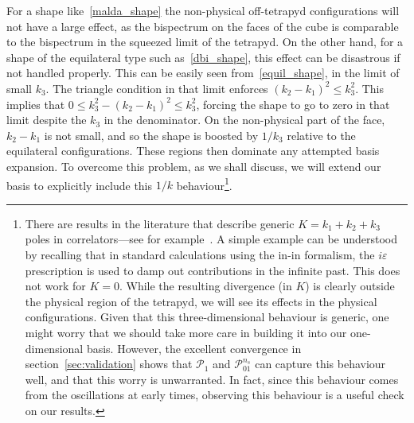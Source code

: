 \documentclass[a4paper,12pt]{extarticle}
\newcommand{\Linvk}{\mathcal{P}_1}
\newcommand{\Lnsboth}{\mathcal{P}^{n_s}_{01}}
\begin{document}
For a shape like~\eqref{malda_shape} the non-physical off-tetrapyd configurations
will not have a large effect, as the bispectrum on the faces of the cube is comparable
to the bispectrum in the squeezed limit of the tetrapyd.
On the other hand, for a shape of the equilateral type such as~\eqref{dbi_shape},
this effect can be disastrous if not handled properly.
This can be easily seen from~\eqref{equil_shape}, in the limit of small $k_3$.
The triangle condition in that limit enforces ${(k_2-k_1)^2\leq k^2_3}$.
This implies that ${0\leq k^2_3-(k_2-k_1)^2\leq k^2_3}$,
forcing the shape to go to zero in that limit despite the $k_3$
in the denominator.
On the non-physical part of the face, $k_2-k_1$ is not small,
and so the shape is boosted by $1/k_3$ relative to the equilateral configurations.
These regions then dominate any attempted basis expansion.
To overcome this problem, as we shall discuss, we will extend our basis to explicitly include this $1/k$ behaviour\footnote{
    There are results in the literature that describe
    generic $K=k_1+k_2+k_3$ poles
    in correlators---see for example~\cite{cosmo_bootstrap}.
    A simple example can be understood by recalling that
    in standard calculations using the in-in formalism, the $i\varepsilon$ prescription
    is used to damp out contributions in the infinite past.
    This does not work for $K=0$. While the resulting
    divergence (in $K$) is clearly outside the physical region of the tetrapyd,
    we will see its effects in the physical configurations.
    Given that this three-dimensional behaviour is generic, one might worry that we should
    take more care in building it into our one-dimensional basis.
    However, the excellent convergence in
    section~\ref{sec:validation}
    shows that $\Linvk$ and $\Lnsboth$ can capture this behaviour well,
    and that this worry is unwarranted.
    In fact, since this behaviour comes from the oscillations
    at early times, observing this behaviour is a useful
    check on our results.%
}.
\end{document}
